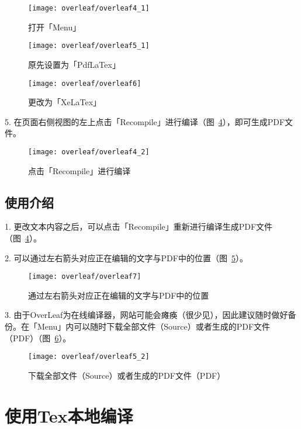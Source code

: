 \begin{figure}
	\centering
	\texttt{[image: overleaf/overleaf4\_1]}
	\caption{打开「Menu」}
	\label{fig:overleaf4_1}
\end{figure}

\begin{figure}
	\centering
	\texttt{[image: overleaf/overleaf5\_1]}
	\caption{原先设置为「PdfLaTex」}
	\label{fig:overleaf5_1}
\end{figure}

\begin{figure}
	\centering
	\texttt{[image: overleaf/overleaf6]}
	\caption{更改为「XeLaTex」}
	\label{fig:overleaf6}
\end{figure}

5. 在页面右侧视图的左上点击「Recompile」进行编译（图~\ref{fig:overleaf4_2}），即可生成PDF文件。

\begin{figure}
	\centering
	\texttt{[image: overleaf/overleaf4\_2]}
	\caption{点击「Recompile」进行编译}
	\label{fig:overleaf4_2}
\end{figure}

\subsection{使用介绍}

1. 更改文本内容之后，可以点击「Recompile」重新进行编译生成PDF文件（图~\ref{fig:overleaf4_2}）。

2. 可以通过左右箭头对应正在编辑的文字与PDF中的位置（图~\ref{fig:overleaf7}）。

\begin{figure}
	\centering
	\texttt{[image: overleaf/overleaf7]}
	\caption{通过左右箭头对应正在编辑的文字与PDF中的位置}
	\label{fig:overleaf7}
\end{figure}

3. 由于OverLeaf为在线编译器，网站可能会瘫痪（很少见），因此建议随时做好备份。在「Menu」内可以随时下载全部文件（Source）或者生成的PDF文件（PDF）（图~\ref{fig:overleaf5_2}）。

\begin{figure}
	\centering
	\texttt{[image: overleaf/overleaf5\_2]}
	\caption{下载全部文件（Source）或者生成的PDF文件（PDF）}
	\label{fig:overleaf5_2}
\end{figure}

\section{使用Tex本地编译}

